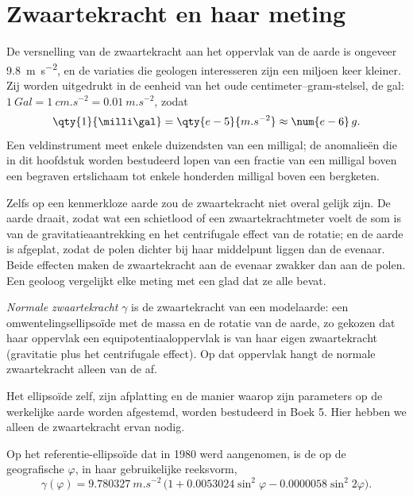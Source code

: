 \section{Zwaartekracht en haar meting}

De versnelling van de zwaartekracht aan het oppervlak van de aarde is ongeveer \qty{9.8}{m.s^{-2}}, en de variaties die geologen interesseren zijn een miljoen keer kleiner. Zij worden uitgedrukt in de eenheid van het oude centimeter--gram-stelsel, de gal: $\qty{1}{Gal} = \qty{1}{cm.s^{-2}} = \qty{0.01}{m.s^{-2}}$, zodat
\[
  \qty{1}{\milli\gal} = \qty{e-5}{m.s^{-2}} \approx \num{e-6}\,g .
\]
Een veldinstrument meet enkele duizendsten van een milligal; de anomalieën die in dit hoofdstuk worden bestudeerd lopen van een fractie van een milligal boven een begraven ertslichaam tot enkele honderden milligal boven een bergketen.

Zelfs op een kenmerkloze aarde zou de zwaartekracht niet overal gelijk zijn. De aarde draait, zodat wat een schietlood of een zwaartekrachtmeter voelt de som is van de gravitatieaantrekking en het centrifugale effect van de rotatie; en de aarde is afgeplat, zodat de polen dichter bij haar middelpunt liggen dan de evenaar. Beide effecten maken de zwaartekracht aan de evenaar zwakker dan aan de polen. Een geoloog vergelijkt elke meting met een glad  dat ze alle bevat.

\begin{definition}\label{def:b1:isostasy-gravity:normal-gravity}
\emph{Normale zwaartekracht} $\gamma$ is de zwaartekracht van een modelaarde: een omwentelingsellipsoïde met de massa en de rotatie van de aarde, zo gekozen dat haar oppervlak een equipotentiaaloppervlak is van haar eigen zwaartekracht (gravitatie plus het centrifugale effect). Op dat oppervlak hangt de normale zwaartekracht alleen van de  af.
\end{definition}

Het ellipsoïde zelf, zijn afplatting en de manier waarop zijn parameters op de werkelijke aarde worden afgestemd, worden bestudeerd in Boek 5. Hier hebben we alleen de zwaartekracht ervan nodig.

\begin{proposition}\label{prop:b1:isostasy-gravity:normal-formula}
Op het referentie-ellipsoïde dat in 1980 werd aangenomen, is de  op de geografische  $\varphi$, in haar gebruikelijke reeksvorm,
\[
  \gamma(\varphi) = \qty{9.780327}{m.s^{-2}}\,\bigl(1 + 0.0053024\sin^2\varphi
  - 0.0000058\sin^2 2\varphi\bigr).
\]
\end{proposition}
\admitted

